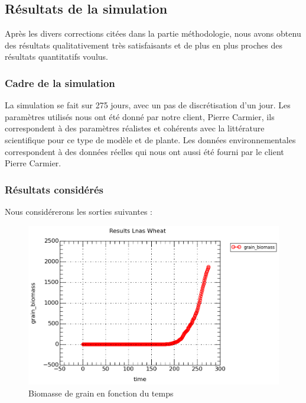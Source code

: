 \subsection{Résultats de la simulation}

Après les divers corrections citées dans la partie méthodologie, nous avons obtenu des résultats qualitativement très satisfaisants et de plus en plus proches des résultats quantitatifs voulus. 

\subsubsection{Cadre de la simulation}

La simulation se fait sur 275 jours, avec un pas de discrétisation d'un jour. Les paramètres utilisés nous ont été donné par notre client, Pierre Carmier, ils correspondent à des paramètres réalistes et cohérents avec la littérature scientifique pour ce type de modèle et de plante. Les données environnementales correspondent à des données réelles qui nous ont aussi été fourni par le client Pierre Carmier.



\subsubsection{Résultats considérés}

Nous considérerons les sorties suivantes :

\begin{figure}

\begin{center}
 \includegraphics[scale = 0.3]{./img/grain.png}
 \caption{Biomasse de grain en fonction du temps}
 \label{fig:resultatGrain}
\end{center}

\end{figure}


